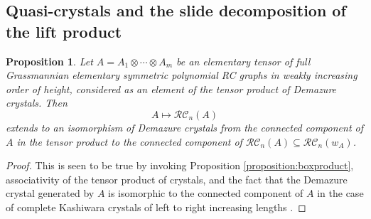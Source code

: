 \documentclass{amsart}
\newtheorem{corollary}[lemma]{Corollary}
\newtheorem{proposition}[lemma]{Proposition}
\theoremstyle{definition}
\theoremstyle{remark}
\numberwithin{equation}{subsection}
\newcommand{\wof}[1]{w_{#1}}
\newcommand{\RC}{\mathcal{RC}}
\newcommand{\maxd}{\mathfrak{m}}
\begin{document}
\subsection{Quasi-crystals and the slide decomposition of the lift product}\label{section:quasicrystal}



\begin{proposition}\label{proposition:liftcrystaliso}
Let $A = A_1\otimes\cdots \otimes A_m$ be an elementary tensor of full Grassmannian elementary symmetric polynomial RC graphs in weakly increasing order of height, considered as an element of the tensor product of Demazure crystals. Then 
$$A\mapsto\RC_n(A)$$
extends to an isomorphism of Demazure crystals from the connected component of $A$ in the tensor product to the connected component of $\RC_n(A)\subseteq \RC_n(\wof{A})$.
\end{proposition}
\begin{proof}
This is seen to be true by invoking Proposition \ref{proposition:boxproduct}, associativity of the tensor product of crystals, and the fact that the Demazure crystal generated by $A$ is isomorphic to the connected component of $A$ in the case of complete Kashiwara crystals of left to right increasing lengths \cite{kouno2020decomposition}.
\end{proof}

\end{document}
